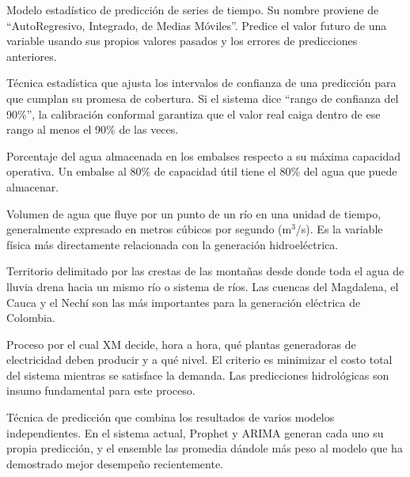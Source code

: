 \documentclass[11pt,a4paper]{article}
\begin{document}
\begin{small}
{\linespread{1.2}\selectfont
\begin{description}[leftmargin=*,style=nextline,font=\bfseries\color{titleblue},itemsep=5pt]

\item[ARIMA]
Modelo estadístico de predicción de series de tiempo. Su nombre proviene de ``AutoRegresivo, Integrado, de Medias Móviles''. Predice el valor futuro de una variable usando sus propios valores pasados y los errores de predicciones anteriores.

\item[Calibración conformal]
Técnica estadística que ajusta los intervalos de confianza de una predicción para que cumplan su promesa de cobertura. Si el sistema dice ``rango de confianza del 90\%'', la calibración conformal garantiza que el valor real caiga dentro de ese rango al menos el 90\% de las veces.

\item[Capacidad útil]
Porcentaje del agua almacenada en los embalses respecto a su máxima capacidad operativa. Un embalse al 80\% de capacidad útil tiene el 80\% del agua que puede almacenar.

\item[Caudal]
Volumen de agua que fluye por un punto de un río en una unidad de tiempo, generalmente expresado en metros cúbicos por segundo (m$^3$/s). Es la variable física más directamente relacionada con la generación hidroeléctrica.

\item[Cuenca hidrográfica]
Territorio delimitado por las crestas de las montañas desde donde toda el agua de lluvia drena hacia un mismo río o sistema de ríos. Las cuencas del Magdalena, el Cauca y el Nechí son las más importantes para la generación eléctrica de Colombia.

\item[Despacho económico]
Proceso por el cual XM decide, hora a hora, qué plantas generadoras de electricidad deben producir y a qué nivel. El criterio es minimizar el costo total del sistema mientras se satisface la demanda. Las predicciones hidrológicas son insumo fundamental para este proceso.

\item[Ensemble]
Técnica de predicción que combina los resultados de varios modelos independientes. En el sistema actual, Prophet y ARIMA generan cada uno su propia predicción, y el ensemble las promedia dándole más peso al modelo que ha demostrado mejor desempeño recientemente.


\end{description}}
\end{small}
\end{document}
